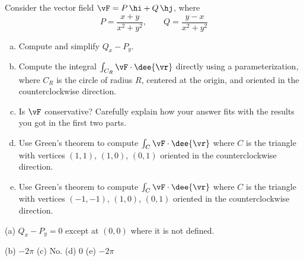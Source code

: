 \begin{question}[M317 2017A] %
Consider the vector field $\vF = P\,\hi + Q\,\hj$, where
\begin{equation*}
P=\frac{x+y}{x^2+y^2},\qquad
Q=\frac{y-x}{x^2+y^2}
\end{equation*}
\begin{enumerate}[(a)]
\item
Compute and simplify $Q_x - P_y$.

\item
Compute the integral $\int_{C_R} \vF \cdot \dee{\vr}$
directly using a parameterization, where $C_R$ is the circle of radius $R$,
centered at the origin, and oriented in the counterclockwise direction.

\item
Is $\vF$ conservative? Carefully explain how your answer fits with the
results you got in the first two parts.

\item
Use Green's theorem to compute $\int_C \vF \cdot \dee{\vr}$ where $C$
is the triangle with vertices $(1, 1)$, $(1, 0)$, $(0, 1)$ oriented in
the counterclockwise direction.

\item
Use Green's theorem to compute $\int_C \vF \cdot \dee{\vr}$ where $C$
is the triangle with vertices $(-1, -1)$, $(1, 0)$, $(0, 1)$ oriented in
the counterclockwise direction.

\end{enumerate}
\end{question}


\begin{answer}
(a) $Q_x-P_y=0$ except at $(0,0)$ where it is not defined.

(b) $-2\pi$\qquad
(c) No.\qquad
(d) $0$\qquad
(e) $-2\pi$
\end{answer}

